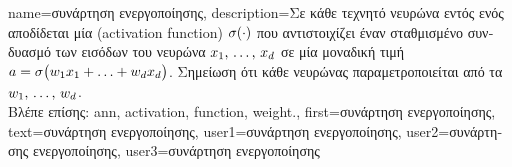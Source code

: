 {name={\foreignlanguage{greek}{συνάρτηση ενεργοποίησης}},
	description={\foreignlanguage{greek}{Σε κάθε τεχνητό νευρώνα εντός ενός} 
		 \foreignlanguage{greek}{αποδίδεται μία}   (activation function)   
		$\sigma(\cdot)$ \foreignlanguage{greek}{που αντιστοιχίζει έναν σταθμισμένο συνδυασμό των εισόδων του
		νευρώνα} $x_{1}, \,\ldots, \,x_{d}$ \foreignlanguage{greek}{σε μία μοναδική τιμή} 
		$a = \sigma\big(w_{1} x_{1}+\ldots+w_{d} x_{d} \big)$. 
		\foreignlanguage{greek}{Ση\-μεί\-ωση ότι κάθε νευρώνας παραμετροποιείται από τα} 
		 $w_{1}, \,\ldots, \,w_{d}$.
		\\
		\foreignlanguage{greek}{Βλέπε επίσης:} \gls{ann}, \gls{activation}, \gls{function}, \gls{weight}.},
	first={\foreignlanguage{greek}{συνάρτηση ενεργοποίησης}},
	text={\foreignlanguage{greek}{συνάρτηση ενεργοποίησης}},
	user1={\foreignlanguage{greek}{συνάρτηση ενεργοποίησης}}, %
	user2={\foreignlanguage{greek}{συνάρτησης ενεργοποίησης}}, %
	user3={\foreignlanguage{greek}{συνάρτηση ενεργοποίησης}} %
}

